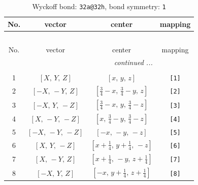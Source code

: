\documentclass[fleqn,8pt]{jsarticle}
\begin{document}
\begin{longtable}{cccc}
\caption{Wyckoff bond: {\tt 32a@32h}, bond symmetry: {\tt 1}}
 \\
 \hline \hline
No. & vector & center & mapping \\ \hline \endfirsthead

\multicolumn{3}{l}{\tablename\ \thetable{}} \\
 \hline \hline
No. & vector & center & mapping \\ \hline \endhead

 \hline \hline
\multicolumn{3}{r}{\footnotesize\it continued ...} \\ \endfoot

 \hline \hline
\multicolumn{3}{r}{} \\ \endlastfoot

1 & $\left[ X,\, Y,\, Z \right]$ & $\left[ x,\, y,\, z \right]$ & {\tt [1]} \\ \hline
2 & $\left[ - X,\, - Y,\, Z \right]$ & $\left[ \frac{3}{4} - x,\, \frac{3}{4} - y,\, z \right]$ & {\tt [2]} \\ \hline
3 & $\left[ - X,\, Y,\, - Z \right]$ & $\left[ \frac{3}{4} - x,\, y,\, \frac{3}{4} - z \right]$ & {\tt [3]} \\ \hline
4 & $\left[ X,\, - Y,\, - Z \right]$ & $\left[ x,\, \frac{3}{4} - y,\, \frac{3}{4} - z \right]$ & {\tt [4]} \\ \hline
5 & $\left[ - X,\, - Y,\, - Z \right]$ & $\left[ - x,\, - y,\, - z \right]$ & {\tt [5]} \\ \hline
6 & $\left[ X,\, Y,\, - Z \right]$ & $\left[ x + \frac{1}{4},\, y + \frac{1}{4},\, - z \right]$ & {\tt [6]} \\ \hline
7 & $\left[ X,\, - Y,\, Z \right]$ & $\left[ x + \frac{1}{4},\, - y,\, z + \frac{1}{4} \right]$ & {\tt [7]} \\ \hline
8 & $\left[ - X,\, Y,\, Z \right]$ & $\left[ - x,\, y + \frac{1}{4},\, z + \frac{1}{4} \right]$ & {\tt [8]} \\
\end{longtable}
\end{document}
